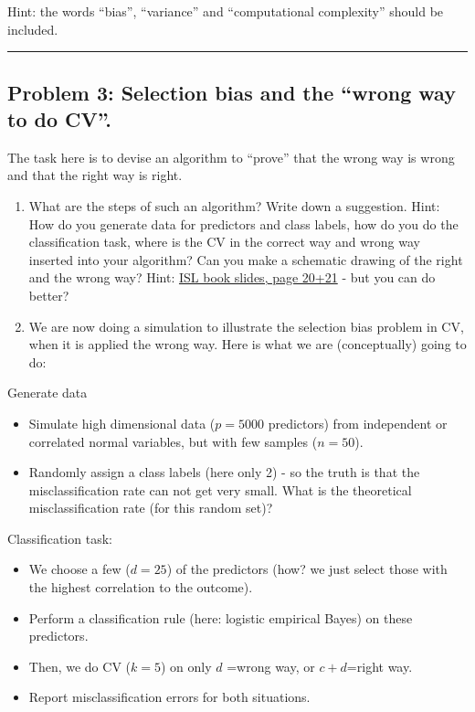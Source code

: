 \documentclass[]{article}
\providecommand{\tightlist}{%
  \setlength{\itemsep}{0pt}\setlength{\parskip}{0pt}}
\begin{document}
Hint: the words ``bias'', ``variance'' and ``computational complexity''
should be included.

\begin{center}\rule{0.5\linewidth}{\linethickness}\end{center}

\subsection{\texorpdfstring{Problem 3: Selection bias and the ``wrong
way to do
CV''.}{Problem 3: Selection bias and the wrong way to do CV.}}\label{problem-3-selection-bias-and-the-wrong-way-to-do-cv.}

The task here is to devise an algorithm to ``prove'' that the wrong way
is wrong and that the right way is right.

\begin{enumerate}
\def\labelenumi{\alph{enumi})}
\item
  What are the steps of such an algorithm? Write down a suggestion.
  Hint: How do you generate data for predictors and class labels, how do
  you do the classification task, where is the CV in the correct way and
  wrong way inserted into your algorithm? Can you make a schematic
  drawing of the right and the wrong way? Hint:
  \href{https://lagunita.stanford.edu/c4x/HumanitiesScience/StatLearning/asset/cv_boot.pdf}{ISL
  book slides, page 20+21} - but you can do better?
\item
  We are now doing a simulation to illustrate the selection bias problem
  in CV, when it is applied the wrong way. Here is what we are
  (conceptually) going to do:
\end{enumerate}

Generate data

\begin{itemize}
\item
  Simulate high dimensional data (\(p=5000\) predictors) from
  independent or correlated normal variables, but with few samples
  (\(n=50\)).
\item
  Randomly assign a class labels (here only 2) - so the truth is that
  the misclassification rate can not get very small. What is the
  theoretical misclassification rate (for this random set)?
\end{itemize}

Classification task:

\begin{itemize}
\tightlist
\item
  We choose a few (\(d=25\)) of the predictors (how? we just select
  those with the highest correlation to the outcome).
\item
  Perform a classification rule (here: logistic empirical Bayes) on
  these predictors.
\item
  Then, we do CV (\(k=5\)) on only \(d\) =wrong way, or \(c+d\)=right
  way.
\item
  Report misclassification errors for both situations.
\end{itemize}
\end{document}
